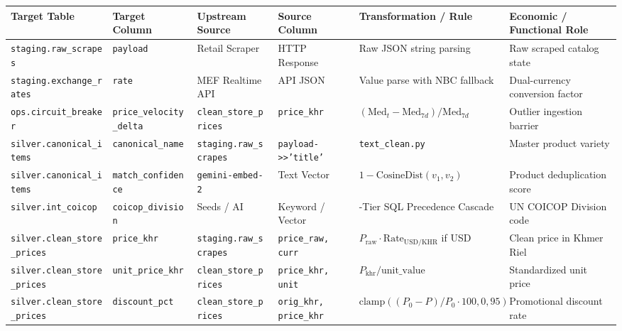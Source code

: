 \documentclass[a4paper, 11pt]{article}
\begin{document}
\begin{table}[H]
\centering
\tiny
\setlength{\tabcolsep}{2.5pt}
\renewcommand{\arraystretch}{1.15}
\begin{tabularx}{\textwidth}{@{}
>{\raggedright\arraybackslash}p{2.8cm}
>{\raggedright\arraybackslash}p{2.6cm}
>{\raggedright\arraybackslash}p{2.2cm}
>{\raggedright\arraybackslash}p{2.2cm}
>{\raggedright\arraybackslash}p{3.2cm}
>{\raggedright\arraybackslash}X
@{}}
\toprule
\textbf{Target Table} & \textbf{Target Column} & \textbf{Upstream Source} & \textbf{Source Column} & \textbf{Transformation / Rule} & \textbf{Economic / Functional Role} \\
\midrule
\texttt{staging.raw\_scrapes} & \texttt{payload} & Retail Scraper & HTTP Response & Raw JSON string parsing & Raw scraped catalog state \\
\texttt{staging.exchange\_rates} & \texttt{rate} & MEF Realtime API & API JSON & Value parse with NBC fallback & Dual-currency conversion factor \\
\texttt{ops.circuit\_breaker} & \texttt{price\_velocity\_delta} & \texttt{clean\_store\_prices} & \texttt{price\_khr} & $(\text{Med}_t - \text{Med}_{7d}) / \text{Med}_{7d}$ & Outlier ingestion barrier \\
\texttt{silver.canonical\_items} & \texttt{canonical\_name} & \texttt{staging.raw\_scrapes} & \texttt{payload->>'title'} & \texttt{text\_clean.py} & Master product variety \\
\texttt{silver.canonical\_items} & \texttt{match\_confidence} & \texttt{gemini-embed-2} & Text Vector & $1 - \text{CosineDist}(v_1, v_2)$ & Product deduplication score \\
\texttt{silver.int\_coicop} & \texttt{coicop\_division} & Seeds / AI & Keyword / Vector & 5-Tier SQL Precedence Cascade & UN COICOP Division code \\
\texttt{silver.clean\_store\_prices} & \texttt{price\_khr} & \texttt{staging.raw\_scrapes} & \texttt{price\_raw, curr} & $P_{\text{raw}} \cdot \text{Rate}_{\text{USD/KHR}}$ if USD & Clean price in Khmer Riel \\
\texttt{silver.clean\_store\_prices} & \texttt{unit\_price\_khr} & \texttt{clean\_store\_prices} & \texttt{price\_khr, unit} & $P_{\text{khr}} / \text{unit\_value}$ & Standardized unit price \\
\texttt{silver.clean\_store\_prices} & \texttt{discount\_pct} & \texttt{clean\_store\_prices} & \texttt{orig\_khr, price\_khr} & $\text{clamp}((P_0 - P)/P_0 \cdot 100, 0, 95)$ & Promotional discount rate \\

\end{tabularx}
\end{table}
\end{document}
